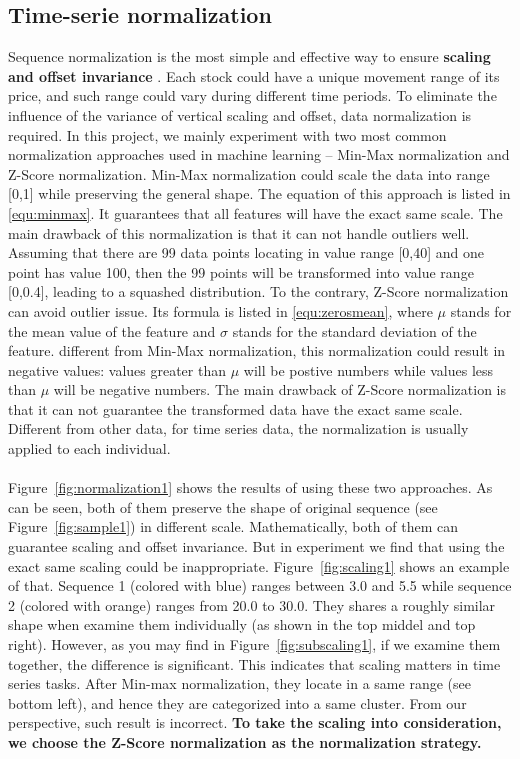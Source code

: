 \subsection{Time-serie normalization}
\label{sec:normalization}
Sequence normalization is the most simple and effective way to ensure \textbf{scaling and offset invariance} \cite{batista2014cid}. Each stock could have a unique movement range of its price, and such range could vary during different time periods. To eliminate the influence of the variance of vertical scaling and offset, data normalization is required. In this project, we mainly experiment with two most common normalization approaches used in machine learning -- Min-Max normalization and Z-Score normalization. Min-Max normalization could scale the data into range [0,1] while preserving the general shape. The equation of this approach is listed in \ref{equ:minmax}. It guarantees that all features will have the exact same scale. The main drawback of this normalization is that it can not handle outliers well. Assuming that there are 99 data points locating in value range [0,40] and one point has value 100, then the 99 points will be transformed into value range [0,0.4], leading to a squashed distribution. To the contrary, Z-Score normalization can avoid outlier issue. Its formula is listed in \ref{equ:zerosmean}, where $\mu$ stands for the mean value of the feature and $\sigma$ stands for the standard deviation of the feature. different from Min-Max normalization, this normalization could result in negative values: values greater than $\mu$ will be postive numbers while values less than $\mu$ will be negative numbers. The main drawback of Z-Score normalization is that it can not guarantee the transformed data have the exact same scale. Different from other data, for time series data, the normalization is usually applied to each individual.\\
\\Figure~\ref{fig:normalization1} shows the results of using these two approaches. As can be seen, both of them preserve the shape of original sequence (see Figure~\ref{fig:sample1}) in different scale. Mathematically, both of them can guarantee scaling and offset invariance. But in experiment we find that using the exact same scaling could be inappropriate. Figure~\ref{fig:scaling1} shows an example of that. Sequence 1 (colored with blue) ranges between 3.0 and 5.5 while sequence 2 (colored with orange) ranges from 20.0 to 30.0. They shares a roughly similar shape when examine them individually (as shown in the top middel and top right). However, as you may find in Figure~\ref{fig:subscaling1}, if we examine them together, the difference is significant. This indicates that scaling matters in time series tasks. After Min-max normalization, they locate in a same range (see bottom left), and hence they are categorized into a same cluster. From our perspective, such result is incorrect. \textbf{To take the scaling into consideration, we choose the Z-Score normalization as the normalization strategy.}

